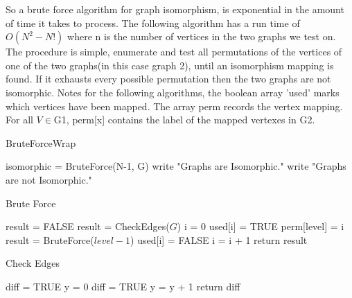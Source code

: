 \documentclass[notitlepage]{report}
\begin{document}
So a brute force algorithm for graph isomorphism, is exponential in the amount of time it takes to process. The following algorithm has a run time of $O(N^{2}-N!)$ where n is the number of vertices in the two graphs we test on. The procedure is simple, enumerate and test all permutations of the vertices of one of the two graphs(in this case graph 2), until an isomorphism mapping is found. If it exhausts every possible permutation then the two graphs are not isomorphic. Notes for the following algorithms, the boolean array 'used' marks which vertices have been mapped. The array perm records the vertex mapping. For all $V\in$G1, perm[x] contains the label of the mapped vertexes in G2.~\cite{tolley}

\begin{algorithm}
\caption{BruteForceWrap}
\begin{algorithmic}[1]

    \State isomorphic = BruteForce(N-1, G) 
        \State write "Graphs are Isomorphic."
    \Else
    	\State write "Graphs are not Isomorphic."
    \EndIf
    \label{A1}
\EndProcedure
\end{algorithmic}
\end{algorithm}

\begin{algorithm}
\caption{Brute Force}
\begin{algorithmic}[1]

    \State result = FALSE 								
    	\State result = CheckEdges($G$)
    \Else
    	\State i = 0
	    				
	        	\State used[i] = TRUE 					
	        	\State perm[level] = i
	        	\State result = BruteForce($level - 1$)
	        	\State used[i] = FALSE					
	        \EndIf
	        \State i = i + 1	
	    \EndWhile
	\EndIf
	\State return result
\label{BruteForce}
\EndProcedure

\end{algorithmic}
\end{algorithm}

\begin{algorithm}
\caption{Check Edges}
\begin{algorithmic}[1]

    \State diff = TRUE
        \State y = 0
        	\State diff = TRUE
        \EndIf
        \State y = y + 1
        \EndWhile
    \EndFor
    \State return diff
\label{CheckEdge}
\EndProcedure

\end{algorithmic}
\end{algorithm}









\end{document}
